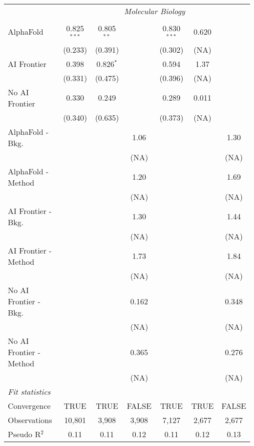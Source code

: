 \begin{tabular}{lcccccc}
 & \multicolumn{6}{c}{\textit{Molecular Biology}} \\ \\
   AlphaFold               & 0.825$^{***}$ & 0.805$^{**}$ &       & 0.830$^{***}$ & 0.620 &   \\   
                           & (0.233)       & (0.391)      &       & (0.302)       & (NA)  &   \\   
   AI Frontier             & 0.398         & 0.826$^{*}$  &       & 0.594         & 1.37  &   \\   
                           & (0.331)       & (0.475)      &       & (0.396)       & (NA)  &   \\   
   No AI Frontier          & 0.330         & 0.249        &       & 0.289         & 0.011 &   \\   
                           & (0.340)       & (0.635)      &       & (0.373)       & (NA)  &   \\   
   AlphaFold - Bkg.        &               &              & 1.06  &               &       & 1.30\\   
                           &               &              & (NA)  &               &       & (NA)\\   
   AlphaFold - Method      &               &              & 1.20  &               &       & 1.69\\   
                           &               &              & (NA)  &               &       & (NA)\\   
   AI Frontier - Bkg.      &               &              & 1.30  &               &       & 1.44\\   
                           &               &              & (NA)  &               &       & (NA)\\   
   AI Frontier - Method    &               &              & 1.73  &               &       & 1.84\\   
                           &               &              & (NA)  &               &       & (NA)\\   
   No AI Frontier - Bkg.   &               &              & 0.162 &               &       & 0.348\\   
                           &               &              & (NA)  &               &       & (NA)\\   
   No AI Frontier - Method &               &              & 0.365 &               &       & 0.276\\   
                           &               &              & (NA)  &               &       & (NA)\\   
   \midrule
   \emph{Fit statistics}\\
   Convergence             &TRUE           & TRUE         & FALSE & TRUE          & TRUE  & FALSE\\  
   Observations            & 10,801        & 3,908        & 3,908 & 7,127         & 2,677 & 2,677\\  
   Pseudo R$^2$            & 0.11          & 0.11         & 0.12  & 0.11          & 0.12  & 0.13\\  
   

\end{tabular}
